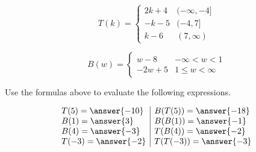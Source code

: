 \documentclass{ximera}
\author{Lee Wayand}
\begin{document}
\begin{exercise}





\[
T(k) = 
\begin{cases}
  2k + 4 &  (-\infty, -4]   \\
  -k - 5 &  (-4, 7]  \\
  k - 6 & (7, \infty)
\end{cases}
\]












\[
B(w) = 
\begin{cases}
  w - 8 &   -\infty < w < 1 \\
  -2w + 5 &  1 \leq w < \infty
\end{cases}
\]










\begin{question}



Use the formulas above to evaluate the following expressions.



\[
\begin{array}{l|l}
T(5) = \answer{-10}  & B(T(5)) = \answer{-18}   \\
B(1) = \answer{3}  & B(B(1)) = \answer{-1}   \\
B(4) = \answer{-3}  & T(B(4)) = \answer{-2}   \\
T(-3) = \answer{-2}  & T(T(-3)) = \answer{-3}   \\

\end{array}
\]




\end{question}














\end{exercise}
\end{document}
